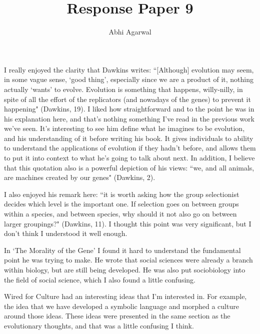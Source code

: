 \documentclass[11pt, oneside]{article}
\title{Response Paper 9}
\author{Abhi Agarwal}
\date{}
\begin{document}
\maketitle

\par I really enjoyed the clarity that Dawkins writes: ``[Although] evolution may seem, in some vague sense, `good thing', especially since we are a product of it, nothing actually `wants' to evolve. Evolution is something that happens, willy-nilly, in spite of all the effort of the replicators (and nowadays of the genes) to prevent it happening" (Dawkins, 19). I liked how straightforward and to the point he was in his explanation here, and that's nothing something I've read in the previous work we've seen. It's interesting to see him define what he imagines to be evolution, and his understanding of it before writing his book. It gives individuals to ability to understand the applications of evolution if they hadn't before, and allows them to put it into context to what he's going to talk about next. In addition, I believe that this quotation also is a powerful depiction of his views: ``we, and all animals, are machines created by our genes" (Dawkins, 2).

\par I also enjoyed his remark here: ``it is worth asking how the group selectionist decides which level is the
important one. If selection goes on between groups within a species, and between species, why should it not also go on between larger groupings?" (Dawkins, 11). I thought this point was very significant, but I don't think I understood it well enough.

\par In `The Morality of the Gene' I found it hard to understand the fundamental point he was trying to make. He wrote that social sciences were already a branch within biology, but are still being developed. He was also put sociobiology into the field of social science, which I also found a little confusing. 

\par Wired for Culture had an interesting ideas that I'm interested in. For example, the idea that we have developed a symbolic language and morphed a culture around those ideas. These ideas were presented in the same section as the evolutionary thoughts, and that was a little confusing I think.
\end{document}
